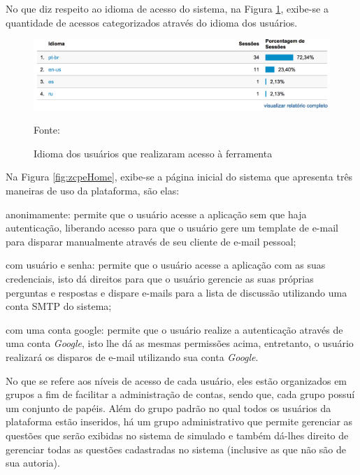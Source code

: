 \FloatBarrier 	%

No que diz respeito ao idioma de acesso do sistema, na Figura
\ref{fig:googleAnalyticsIdioma}, exibe-se a quantidade de acessos categorizados
através do idioma dos usuários.

\begin{figure}[h!tb]
	\caption{Idioma dos usuários que realizaram acesso à ferramenta}
	\label{fig:googleAnalyticsIdioma}

	\centering
	\includegraphics[width=\textwidth]{images/resultados/google-analytics-idioma.png}

	\centering
	\footnotesize Fonte: \fonteOAutor
\end{figure}

\FloatBarrier 	%

Na Figura \ref{fig:zcpeHome}, exibe-se a página inicial do sistema que apresenta
três maneiras de uso da plataforma, são elas:

\begin{alineas}
    \item anonimamente: permite que o usuário acesse a aplicação sem que haja
    autenticação, liberando acesso para que o usuário gere um template de e-mail
    para disparar manualmente através de seu cliente de e-mail pessoal;
    \item com usuário e senha: permite que o usuário acesse a aplicação com as
    suas credenciais, isto dá direitos para que o usuário gerencie as suas
    próprias perguntas e respostas e dispare e-mails para a lista de discussão
    utilizando uma conta \acs{SMTP} do sistema;
    \item com uma conta google: permite que o usuário realize a autenticação
    através de uma conta \textit{Google}, isto lhe dá as mesmas permissões
    acima, entretanto, o usuário realizará os disparos de e-mail utilizando sua conta
    \textit{Google}.
\end{alineas}

No que se refere aos níveis de acesso  de cada usuário, eles estão organizados
em grupos a fim de facilitar a administração de contas, sendo que, cada grupo
possuí um conjunto de papéis. Além do grupo padrão no qual todos os usuários
da plataforma estão inseridos, há um grupo administrativo que permite gerenciar
as questões que serão exibidas no sistema de simulado e também dá-lhes direito
de gerenciar todas as questões cadastradas no sistema (inclusive as que não são
de sua autoria).

